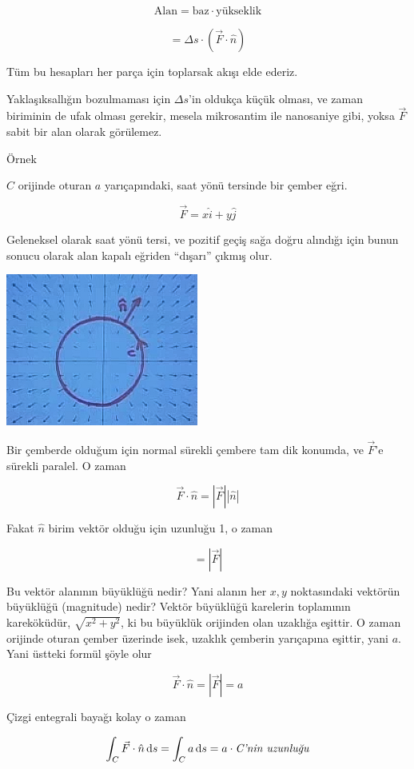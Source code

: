 \documentclass[12pt,fleqn]{article}\usepackage{../../common}
\begin{document}
$$ \textrm{Alan}  = \textrm{baz} \cdot \textrm{yükseklik} $$

$$ = \Delta s \cdot (\vec{F} \cdot \hat{n} )$$

Tüm bu hesapları her parça için toplarsak akışı elde ederiz. 

Yaklaşıksallığın bozulmaması için $\Delta s$'in oldukça küçük olması, ve
zaman biriminin de ufak olması gerekir, mesela mikrosantim ile nanosaniye
gibi, yoksa $\vec{F}$ sabit bir alan olarak görülemez. 

Örnek

$C$ orijinde oturan $a$ yarıçapındaki, saat yönü tersinde bir çember eğri. 

$$ \vec{F} = x\hat{i} + y\hat{j} $$

Geleneksel olarak saat yönü tersi, ve pozitif geçiş sağa doğru alındığı
için bunun sonucu olarak alan kapalı eğriden ``dışarı'' çıkmış olur. 
\begin{center}
\includegraphics[height=5cm]{23_6.png}
\end{center}
Bir çemberde olduğum için normal sürekli çembere tam dik konumda, ve
$\vec{F}$'e sürekli paralel. O zaman 

$$ \vec{F} \cdot \hat{n} = |\vec{F}||\hat{n}| $$

Fakat $\hat{n}$ birim vektör olduğu için uzunluğu 1, o zaman

$$  = |\vec{F}| $$

Bu vektör alanının büyüklüğü nedir? Yani alanın her $x,y$ noktasındaki
vektörün büyüklüğü (magnitude) nedir? Vektör büyüklüğü karelerin toplamının
kareköküdür, $\sqrt{x^2 + y^2}$, ki bu büyüklük orijinden olan uzaklığa
eşittir. O zaman orijinde oturan çember üzerinde isek, uzaklık çemberin
yarıçapına eşittir, yani $a$. Yani üstteki formül şöyle olur

$$ \vec{F} \cdot \hat{n} = |\vec{F}| = a$$

Çizgi entegrali bayağı kolay o zaman

$$ \int_C \vec{F} \cdot \hat{n} \,\mathrm{d} s 
= \int_C a \,\mathrm{d} s  = a \cdot \textit{C'nin uzunluğu}
$$
\end{document}
